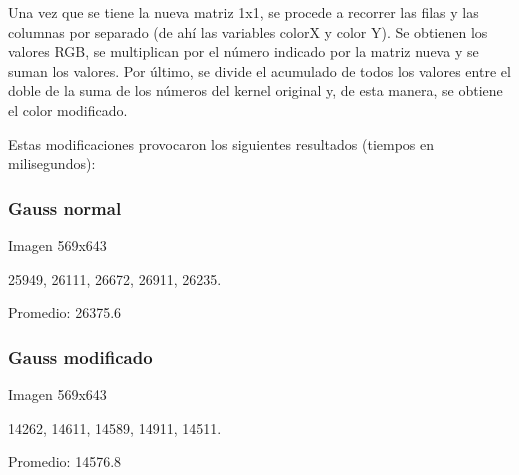 \documentclass[conference]{IEEEtran}
\begin{document}
Una vez que se tiene la nueva matriz 1x1, se procede a recorrer las filas y las columnas por separado (de ahí las variables colorX y color Y). Se obtienen los valores RGB, se multiplican por el número indicado por la matriz nueva y se suman los valores. Por último, se divide el acumulado de todos los valores entre el doble de la suma de los números del kernel original y, de esta manera, se obtiene el color modificado.\newline

Estas modificaciones provocaron los siguientes resultados (tiempos en milisegundos):\newline


\subsubsection*{Gauss normal}\newline

Imagen 569x643\newline

25949, 26111, 26672, 26911, 26235.
\newline

Promedio: 26375.6\newline



\subsubsection*{Gauss modificado}\newline

Imagen 569x643\newline

14262, 14611, 14589, 14911, 14511.
\newline

Promedio: 14576.8








\end{document}
